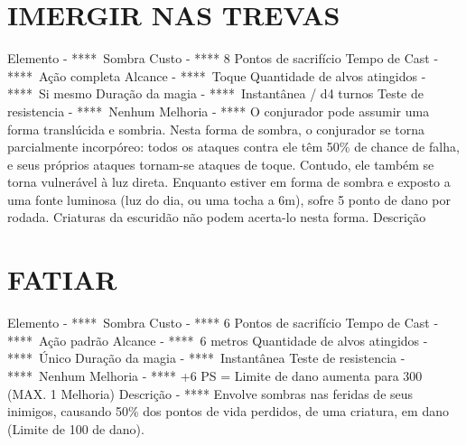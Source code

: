 \documentclass{article}%
\begin{document}
\section{IMERGIR NAS TREVAS}%
\label{sec:IMERGIRNASTREVAS}%
Elemento {-} ****~Sombra\newline%
Custo {-} **** 8 Pontos de sacrifício\newline%
Tempo de Cast {-} ****~Ação completa\newline%
Alcance {-} ****~Toque\newline%
Quantidade de alvos atingidos {-} ****~Si mesmo\newline%
Duração da magia {-} ****~Instantânea / d4 turnos\newline%
Teste de resistencia {-} ****~Nenhum\newline%
Melhoria {-} **** O conjurador pode assumir uma forma translúcida e sombria. Nesta forma de sombra, o conjurador se torna parcialmente incorpóreo: todos os ataques contra ele têm 50\% de chance de falha, e seus próprios ataques tornam{-}se ataques de toque. Contudo, ele também se torna vulnerável à luz direta. Enquanto estiver em forma de sombra e exposto a uma fonte luminosa (luz do dia, ou uma tocha a 6m), sofre 5 ponto de dano por rodada. Criaturas da escuridão não podem acerta{-}lo nesta forma.\newline%
Descrição \newline%

%
\section{FATIAR}%
\label{sec:FATIAR}%
Elemento {-} ****~Sombra\newline%
Custo {-} **** 6 Pontos de sacrifício\newline%
Tempo de Cast {-} ****~Ação padrão\newline%
Alcance {-} ****~6 metros\newline%
Quantidade de alvos atingidos {-} ****~Único\newline%
Duração da magia {-} ****~Instantânea\newline%
Teste de resistencia {-} ****~Nenhum\newline%
Melhoria {-} **** +6 PS = Limite de dano aumenta para 300 (MAX. 1 Melhoria)\newline%
Descrição {-} **** Envolve sombras nas feridas de seus inimigos, causando 50\% dos pontos de vida perdidos, de uma criatura, em dano (Limite de 100 de dano).\newline%
\end{document}

